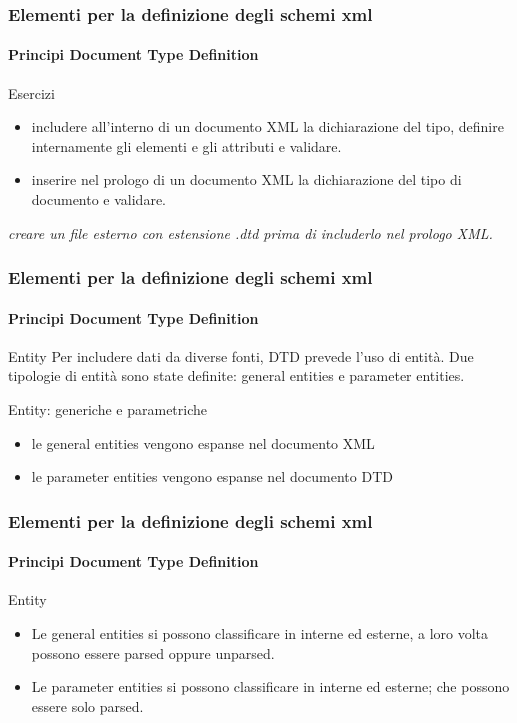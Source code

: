 \begin{frame}
    \frametitle{Elementi per la definizione degli schemi xml}
    \framesubtitle{Principi Document Type Definition}
    \addtocounter{nframe}{1}

    \begin{block}{Esercizi}
    \begin{itemize}
        \item includere all'interno di un documento XML la dichiarazione del tipo, definire internamente gli elementi e gli attributi e validare.
        \item inserire nel prologo di un documento XML la dichiarazione del tipo di documento e validare.
    \end{itemize}
    \end{block}

    \textit{creare un file esterno con estensione .dtd prima di includerlo nel prologo XML.}

\end{frame}


\begin{frame}
    \frametitle{Elementi per la definizione degli schemi xml}
    \framesubtitle{Principi Document Type Definition}
    \addtocounter{nframe}{1}

    \begin{block}{Entity}
        Per includere dati da diverse fonti, DTD prevede l'uso di entità. Due tipologie di entità sono state definite: general entities e parameter entities.
    \end{block}

    \begin{block}{Entity: generiche e parametriche}
    \begin{itemize}
        \item le general entities vengono espanse nel documento XML
        \item le parameter entities vengono espanse nel documento DTD
    \end{itemize}
    \end{block}
    
\end{frame}

\begin{frame}
    \frametitle{Elementi per la definizione degli schemi xml}
    \framesubtitle{Principi Document Type Definition}
    \addtocounter{nframe}{1}

    \begin{block}{Entity}
    \begin{itemize}
        \item  Le general entities si possono classificare in interne ed esterne, a loro volta possono essere parsed oppure unparsed.
        \item Le parameter entities si possono classificare in interne ed esterne; che  possono essere solo parsed.
    \end{itemize}
    \end{block}
    
\end{frame}


